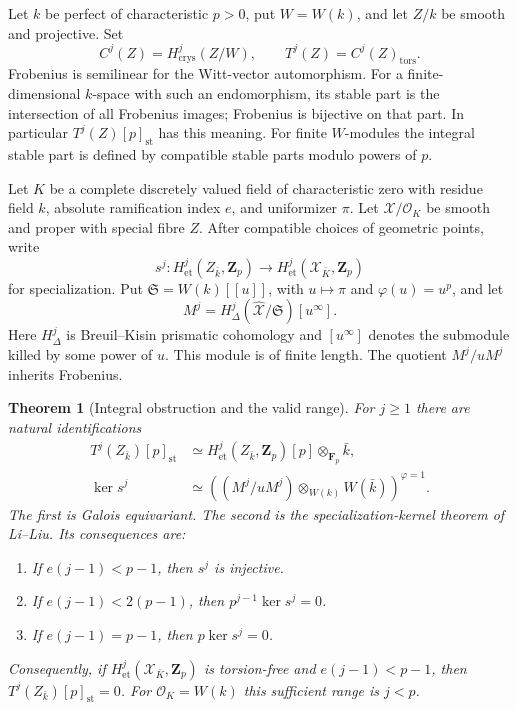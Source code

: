 \documentclass[11pt]{article}
\newcommand{\OO}{\mathcal O}\newcommand{\ZZ}{\mathbf Z}
\newcommand{\FF}{\mathbf F}\newcommand{\PP}{\mathbf P}
\newcommand{\et}{\mathrm{et}}\newcommand{\crys}{\mathrm{crys}}
\newcommand{\st}{\mathrm{st}}\newcommand{\tors}{\mathrm{tors}}
\newtheorem{theorem}{Theorem}[section]
\theoremstyle{definition}\newtheorem{definition}[theorem]{Definition}
\theoremstyle{remark}\newtheorem{remark}[theorem]{Remark}
\begin{document}
Let $k$ be perfect of characteristic $p>0$, put $W=W(k)$, and let $Z/k$ be smooth and projective. Set
\[
 C^j(Z)=H^j_{\crys}(Z/W),\qquad
 T^j(Z)=C^j(Z)_{\tors}.
\]
Frobenius is semilinear for the Witt-vector automorphism. For a finite-dimensional $k$-space with such an endomorphism, its stable part is the intersection of all Frobenius images; Frobenius is bijective on that part. In particular $T^j(Z)[p]_{\st}$ has this meaning. For finite $W$-modules the integral stable part is defined by compatible stable parts modulo powers of $p$.

Let $K$ be a complete discretely valued field of characteristic zero with residue field $k$, absolute ramification index $e$, and uniformizer $\pi$. Let $\mathcal X/\OO_K$ be smooth and proper with special fibre $Z$. After compatible choices of geometric points, write
\[
 s^j:H^j_{\et}(Z_{\bar k},\ZZ_p)
       \longrightarrow H^j_{\et}(\mathcal X_{\bar K},\ZZ_p)
\]
for specialization. Put $\mathfrak S=W(k)[[u]]$, with $u\mapsto\pi$ and $\varphi(u)=u^p$, and let
\[
 M^j=H^j_\Delta(\widehat{\mathcal X}/\mathfrak S)[u^\infty].
\]
Here $H^j_\Delta$ is Breuil--Kisin prismatic cohomology and $[u^\infty]$ denotes the submodule killed by some power of $u$. This module is of finite length. The quotient $M^j/uM^j$ inherits Frobenius.

\begin{theorem}[Integral obstruction and the valid range]\label{thm:obstruction}
For $j\geq1$ there are natural identifications
\begin{align}
 T^j(Z_{\bar k})[p]_{\st}
  &\simeq H^j_{\et}(Z_{\bar k},\ZZ_p)[p]
                          \otimes_{\FF_p}\bar k,\label{eq:stable}\\
 \ker s^j
  &\simeq\left((M^j/uM^j)\otimes_{W(k)}W(\bar k)\right)^{\varphi=1}.
                                                    \label{eq:kernel}
\end{align}
The first is Galois equivariant. The second is the specialization-kernel theorem of Li--Liu. Its consequences are:
\begin{enumerate}
\item If $e(j-1)<p-1$, then $s^j$ is injective.
\item If $e(j-1)<2(p-1)$, then $p^{j-1}\ker s^j=0$.
\item If $e(j-1)=p-1$, then $p\ker s^j=0$.
\end{enumerate}
Consequently, if $H^j_{\et}(\mathcal X_{\bar K},\ZZ_p)$ is torsion-free and $e(j-1)<p-1$, then $T^j(Z_{\bar k})[p]_{\st}=0$. For $\OO_K=W(k)$ this sufficient range is $j<p$.
\end{theorem}
\end{document}
